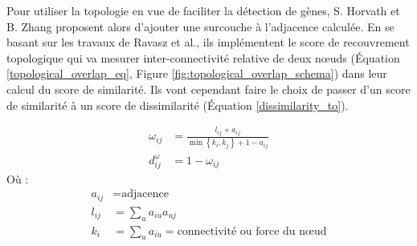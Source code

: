 
Pour utiliser la topologie en vue de faciliter la détection de gènes, S. Horvath et B. Zhang proposent alors d'ajouter une surcouche à l'adjacence calculée. En se basant sur les travaux de Ravasz et al., ils implémentent le score de recouvrement topologique qui va mesurer inter-connectivité relative de deux nœuds (Équation \ref{topological_overlap_eq}, Figure \ref{fig:topological_overlap_schema}) dans leur calcul du score de similarité. Ils vont cependant faire le choix de passer d'un score de similarité à un score de dissimilarité (Équation \ref{dissimilarity_to}). 

\begin{align} 
    \omega_{i j} &= \frac{l_{i j}+a_{i j}}{\min \left\{k_{i}, k_{j}\right\}+1-a_{i j}} \label{topological_overlap_eq} \\ 
    d_{i j}^{\omega} &= 1-\omega_{i j} \label{dissimilarity_to}
\end{align}
Où :
\begin{align*}
    a_{i j} & = \text{adjacence} \\
    l_{i j} &= \sum_{u} a_{i u} a_{u j} \\
    k_{i} &= \sum_{u} a_{i u} = \text{connectivité ou force du nœud}
\end{align*}

